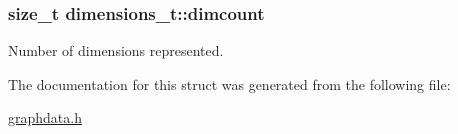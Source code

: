 \subsubsection[{\texorpdfstring{dimcount}{dimcount}}]{\setlength{\rightskip}{0pt plus 5cm}size\+\_\+t dimensions\+\_\+t\+::dimcount}\hypertarget{structdimensions__t_a025871853cf8339459bab76ea0f6fef6}{}\label{structdimensions__t_a025871853cf8339459bab76ea0f6fef6}
Number of dimensions represented. 

The documentation for this struct was generated from the following file\+:\begin{DoxyCompactItemize}
\item 
\hyperlink{graphdata_8h}{graphdata.\+h}\end{DoxyCompactItemize}
